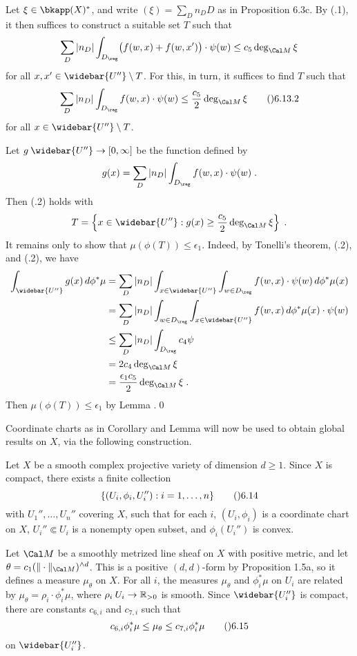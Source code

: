 Let $\xi\in\bkapp(X)^{*}$, and write $(\xi)=\sum_D n_D D$ as in
Proposition \06.3c.
By (.1), it then suffices to construct a suitable set $T$ such that
$$\sum_D |n_D|\int_{D_\reg} \bigl(f(w,x)+f(w,x')\bigr)\cdot\psi(w)
  \le c_5\deg_{\Cal M}\xi$$
for all $x,x'\in\widebar{U''}\setminus T$.  For this, in turn, it suffices to
find $T$ such that
$$\sum_D |n_D|\int_{D_\reg} f(w,x)\cdot\psi(w) \le \frac{c_5}{2}\deg_{\Cal M}\xi
  \tag\06.13.2$$
for all $x\in\widebar{U''}\setminus T$.

Let $g\:\widebar{U''}\to[0,\infty]$ be the function defined by
$$g(x) = \sum_D |n_D| \int_{D_\reg} f(w,x)\cdot\psi(w)\;.$$
Then (.2) holds with
$$T = \left\{x\in\widebar{U''} : g(x)\ge \frac{c_5}{2}\deg_{\Cal M}\xi\right\}
  \;.$$
It remains only to show that $\mu(\phi(T))\le\epsilon_1$.
Indeed, by Tonelli's theorem, (.2), and (.2), we have
$$\split \int_{\widebar{U''}} g(x)\,d\phi^{*}\mu
  &= \sum_D |n_D| \int_{x\in\widebar{U''}} \int_{w\in D_\reg} f(w,x)
    \cdot \psi(w)\,d\phi^{*}\mu(x) \\
  &= \sum_D |n_D| \int_{w\in D_\reg} \int_{x\in\widebar{U''}} f(w,x)
    \,d\phi^{*}\mu(x)\cdot\psi(w) \\
  &\le \sum_D |n_D| \int_{D_\reg} c_4 \psi \\
  &= 2c_4\deg_{\Cal M}\xi \\
  &= \frac{\epsilon_1c_5}{2} \deg_{\Cal M}\xi\;.\endsplit$$
Then $\mu(\phi(T))\le\epsilon_1$ by Lemma .\qed
\enddemo

Coordinate charts as in Corollary  and Lemma  will now be used
to obtain global results on $X$, via the following construction.

Let $X$ be a smooth complex projective variety of dimension $d\ge1$.
Since $X$ is compact, there exists a finite collection
$$\{(U_i,\phi_i,U_i''):i=1,\dots,n\}\tag\06.14$$
with $U_1'',\dots,U_n''$ covering $X$, such that for each $i$,
$(U_i,\phi_i)$ is a coordinate chart on $X$, $U_i''\Subset U_i$ is a
nonempty open subset, and $\phi_i(U_i'')$ is convex.

Let $\Cal M$ be a smoothly metrized line sheaf on $X$ with positive metric,
and let $\theta=c_1(\|\cdot\|_{\Cal M})^{\wedge d}$\snug.  This is a
positive $(d,d)$\snug-form by Proposition \01.5a, so it defines a measure
$\mu_\theta$ on $X$.  For all $i$, the measures $\mu_\theta$
and $\phi_i^{*}\mu$ on $U_i$ are related by
$\mu_\theta=\rho_i\cdot\phi_i^{*}\mu$, where $\rho_i\:U_i\to\Bbb R_{>0}$
is smooth.  Since $\widebar{U_i''}$ is compact, there are constants $c_{6,i}$
and $c_{7,i}$ such that
$$c_{6,i}\phi_i^{*}\mu \le \mu_\theta \le c_{7,i}\phi_i^{*}\mu\tag\06.15$$
on $\widebar{U_i''}$.

